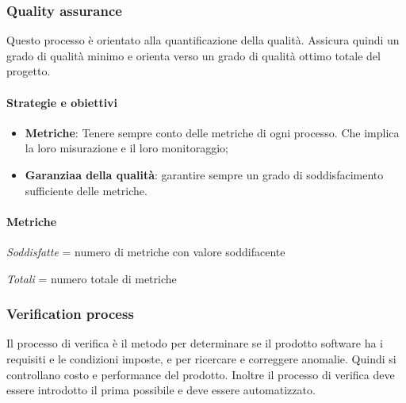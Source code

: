                     
            \subsubsection{Quality assurance}
            Questo processo è orientato alla quantificazione della qualità. Assicura quindi un grado di qualità minimo e orienta verso un grado di qualità ottimo totale del progetto.
            
            \paragraph{Strategie e obiettivi}
            \begin{itemize}
                \item \textbf{Metriche}: Tenere sempre conto delle metriche di ogni processo. Che implica la loro misurazione e il loro monitoraggio;
                \item \textbf{Garanziaa della qualità}: garantire sempre un grado di soddisfacimento sufficiente delle metriche.
            \end{itemize}
            
            \paragraph{Metriche}
            \hphantom{}
            \def\productquality{
                {   Percentuale di metriche soddisfatte,
                    $\frac{Soddisfatte}{Totali}$,
                    $ \geq 60 \%$,
                    $ \geq 80 \% $
                },
            }
            
            
\textit{Soddisfatte} = numero di metriche con valore soddifacente

\textit{Totali} = numero totale di metriche
 
            \newpage
            \subsubsection{Verification process}
            Il processo di verifica è il metodo per determinare se il prodotto software ha i requisiti e le condizioni imposte, e per ricercare e correggere anomalie. Quindi si controllano costo e performance del prodotto. Inoltre il processo di verifica deve essere introdotto il prima possibile e deve essere automatizzato.
            
